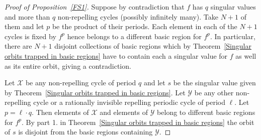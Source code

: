 \documentclass[11pt, twoside]{article}
\theoremstyle{definition}
\begin{document}
{
\begin{proof}[Proof of Proposition~\ref{FS1}]
Suppose by contradiction that $f$ has $q$ singular values and more than $q$ non-repelling cycles (possibly infinitely many). Take $N+1$ of them and let $p$ be the product of their periods.
Each element in each of the $N+1$ cycles is fixed by $f^p$ hence belongs to a different basic region for $f^p$. In particular,  there are $N+1$ disjoint collections of basic regions which by Theorem~\ref{Singular orbits trapped in basic regions} have to contain each a singular value for $f$ as  well as its entire orbit, giving a contradiction. 

Let  $\mathcal{X}$ be any non-repelling cycle of period $q$ and let $s$ be the singular value given by Theorem~\ref{Singular orbits trapped in basic regions}. Let $\mathcal{Y}$ be any other non-repelling cycle or a  rationally invisible repelling periodic cycle  of period $\ell$. Let $p=\ell\cdot q$. Then elements of $\mathcal{X}$ and elements of $\mathcal{Y}$ belong to different basic regions for $f^p$. By part 1. in Theorem~\ref{Singular orbits trapped in basic regions} the orbit of $s$ is disjoint from the basic regions containing $\mathcal{Y}$.  
\end{proof}
} 
 
\end{document}
